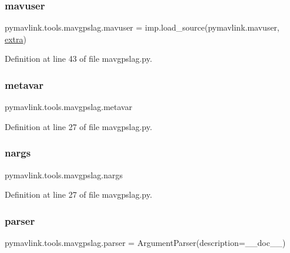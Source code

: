 \subsubsection{\texorpdfstring{mavuser}{mavuser}}
{\footnotesize\ttfamily pymavlink.\+tools.\+mavgpslag.\+mavuser = imp.\+load\+\_\+source(\textquotesingle{}pymavlink.\+mavuser\textquotesingle{}, \mbox{\hyperlink{namespacepymavlink_1_1tools_1_1mavgpslag_ac52ac91c0c51a00372c6261a1a0adbf7}{extra}})}



Definition at line 43 of file mavgpslag.\+py.

\mbox{\label{namespacepymavlink_1_1tools_1_1mavgpslag_aaae38cb4a05fdc0d20f4d07c4c04d3d7}} 
\subsubsection{\texorpdfstring{metavar}{metavar}}
{\footnotesize\ttfamily pymavlink.\+tools.\+mavgpslag.\+metavar}



Definition at line 27 of file mavgpslag.\+py.

\mbox{\label{namespacepymavlink_1_1tools_1_1mavgpslag_a85b8bb2a28b64637a49cee3e19d5159d}} 
\subsubsection{\texorpdfstring{nargs}{nargs}}
{\footnotesize\ttfamily pymavlink.\+tools.\+mavgpslag.\+nargs}



Definition at line 27 of file mavgpslag.\+py.

\mbox{\label{namespacepymavlink_1_1tools_1_1mavgpslag_abb0d882d3a0f5fc7846834c903d1f0d8}} 
\subsubsection{\texorpdfstring{parser}{parser}}
{\footnotesize\ttfamily pymavlink.\+tools.\+mavgpslag.\+parser = Argument\+Parser(description=\+\_\+\+\_\+doc\+\_\+\+\_\+)}



